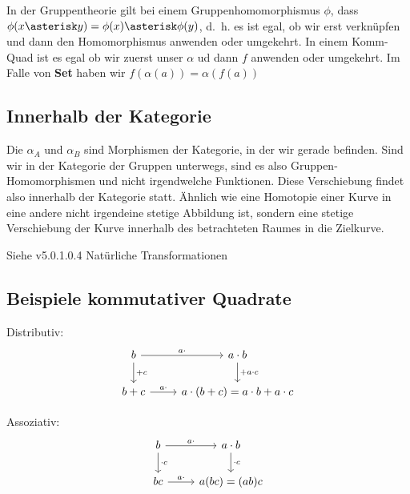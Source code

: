 \documentclass[a4paper]{amsart}
\theoremstyle{definition}
\begin{document}
In der Gruppentheorie gilt bei einem Gruppenhomomorphismus $\phi$, dass $\phi(x \asterisk y) = \phi(x) \asterisk \phi(y)$, d.~h. es ist egal, ob wir erst verknüpfen und dann den Homomorphismus anwenden oder umgekehrt. In einem Komm-Quad ist es egal ob wir zuerst unser $\alpha$ ud dann $f$ anwenden oder umgekehrt. Im Falle von \textbf{Set} haben wir $f(\alpha(a)) = \alpha( f(a))$

\subsection{Innerhalb der Kategorie }
Die $\alpha_A$ und $\alpha_B$ sind Morphismen der Kategorie, in der wir gerade befinden. Sind wir in der Kategorie der Gruppen unterwegs, sind es also Gruppen-Homomorphismen und nicht irgendwelche  Funktionen. Diese Verschiebung findet also innerhalb der Kategorie statt. Ähnlich wie eine Homotopie einer Kurve in eine andere nicht irgendeine stetige Abbildung ist, sondern eine stetige Verschiebung der Kurve innerhalb des betrachteten Raumes in die Zielkurve.

Siehe v5.0.1.0.4 Natürliche Transformationen

\subsection{Beispiele kommutativer Quadrate}

Distributiv:
\begin{equation}
    \begin{tikzcd}
        b   \arrow[d, "+ c"]  \arrow[r, "a \cdot"] & a \cdot b \arrow[d, "+ a \cdot c"]\\
        b+c                   \arrow[r, "a \cdot"] & a \cdot (b+c) = a \cdot b+a \cdot c
    \end{tikzcd}
\end{equation}

Assoziativ:
\begin{equation}
    \begin{tikzcd}
    b   \arrow[d, "\cdot c"]  \arrow[r, "a \cdot"] & a \cdot b \arrow[d, "\cdot c"]\\
    b c                   \arrow[r, "a \cdot"] & a (bc) = (ab) c
\end{tikzcd}
\end{equation}
\end{document}
